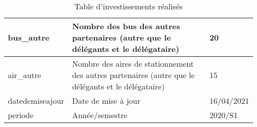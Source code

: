 \begin{table}[H]
\begin{center}
\begin{tabularx}{17.5cm}{|p{2.5cm}|X|p{2.5cm}|}
				\hline
				bus\_autre        & Nombre des bus des autres partenaires (autre que le délégants et le délégataire)                    & 20               \\
				\hline
				air\_autre        & Nombre des aires de stationnement des autres partenaires (autre que le délégants et le délégataire) & 15               \\
				\hline
				datedemiseajour   & Date de mise à jour                                                                                 & 16/04/2021       \\
				\hline
				periode           & Année/semestre                                                                                      & 2020/S1          \\
				\hline
			\end{tabularx}
			\caption{Table d'investissements réalisés}
		\end{center}
	\end{table}

